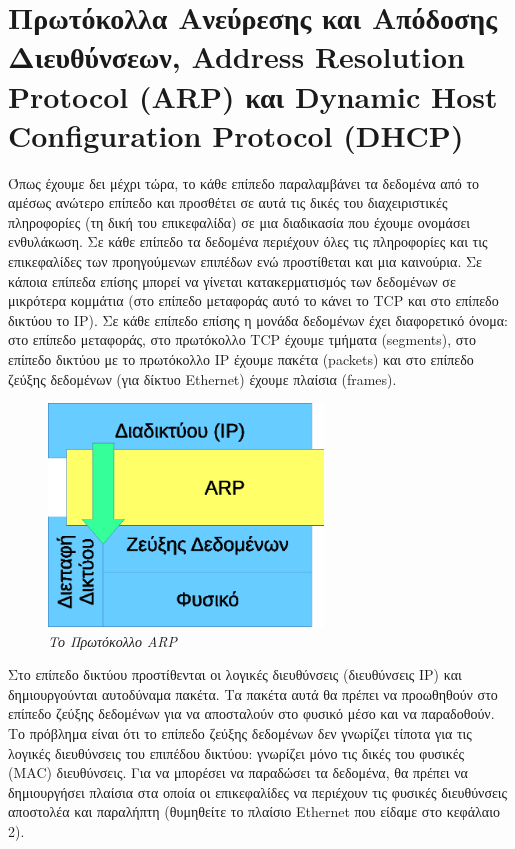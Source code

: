 %
%
\section{Πρωτόκολλα Ανεύρεσης και Απόδοσης Διευθύνσεων, Address Resolution Protocol (ARP) και Dy\-nam\-ic Host Configuration Protocol (DHCP)}

Όπως έχουμε δει μέχρι τώρα, το κάθε επίπεδο παραλαμβάνει τα δεδομένα από το αμέσως ανώτερο επίπεδο και προσθέτει σε αυτά τις δικές του διαχειριστικές πληροφορίες (τη δική του επικεφαλίδα) σε μια διαδικασία που έχουμε ονομάσει ενθυλάκωση. Σε κάθε επίπεδο τα δεδομένα περιέχουν όλες τις πληροφορίες και τις επικεφαλίδες των προηγούμενων επιπέδων ενώ προστίθεται και μια καινούρια. Σε κάποια επίπεδα επίσης μπορεί να γίνεται κατακερματισμός των δεδομένων σε μικρότερα κομμάτια (στο επίπεδο μεταφοράς αυτό το κάνει το TCP και στο επίπεδο δικτύου το IP). Σε κάθε επίπεδο επίσης η μονάδα δεδομένων έχει διαφορετικό όνομα: στο επίπεδο μεταφοράς, στο πρωτόκολλο TCP έχουμε τμήματα (segments), στο επίπεδο δικτύου με το πρωτόκολλο IP έχουμε πακέτα (packets) και στο επίπεδο ζεύξης δεδομένων (για δίκτυο Ethernet) έχουμε πλαίσια (frames). 


\begin{figure}[!ht]
  \centering
  \includegraphics[width=0.65\textwidth]{images/chapter3/3-15}
  \caption {\textsl{Το Πρωτόκολλο ARP}}
  \label{3-15}
\end{figure}


Στο επίπεδο δικτύου προστίθενται οι λογικές διευθύνσεις (διευθύνσεις IP) και δημιουργούνται αυτοδύναμα πακέτα. Τα πακέτα αυτά θα πρέπει να προωθηθούν στο επίπεδο ζεύξης δεδομένων για να αποσταλούν στο φυσικό μέσο και να παραδοθούν. Το πρόβλημα είναι ότι το επίπεδο ζεύξης δεδομένων δεν γνωρίζει τίποτα για τις λογικές διευθύνσεις του επιπέδου δικτύου: γνωρίζει μόνο τις δικές του φυσικές (MAC) διευθύνσεις. Για να μπορέσει να παραδώσει τα δεδομένα, θα πρέπει να δημιουργήσει πλαίσια στα οποία οι επικεφαλίδες να περιέχουν τις φυσικές διευθύνσεις αποστολέα και παραλήπτη (θυμηθείτε το πλαίσιο Ethernet που είδαμε στο κεφάλαιο 2).

